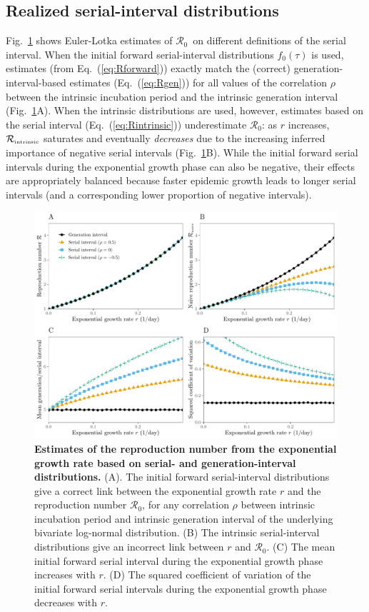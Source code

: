 \documentclass[12pt]{article}
\newcommand{\eref}[1]{Eq.~(\ref{eq:#1})}
\newcommand{\fref}[1]{Fig.~\ref{fig:#1}}
\newcommand{\Rx}[1]{\ensuremath{{\mathcal R}_{#1}}\xspace}
\newcommand{\Ro}{\Rx{0}}
\newcommand{\Rintrinsic}{\ensuremath{{\mathcal R}_{\textrm{\tiny intrinsic}}}\xspace}
\providecommand{\DIFaddtex}[1]{{\protect\color{blue}\uwave{#1}}} %
\providecommand{\DIFaddbegin}{} %
\providecommand{\DIFaddend}{} %
\providecommand{\DIFadd}[1]{\texorpdfstring{\DIFaddtex{#1}}{#1}} %
\newcommand{\DIFaddincludegraphics}[2][]{{\color{blue}\fbox{\DIFOincludegraphics[#1]{#2}}}} %
\DeclareRobustCommand{\DIFaddbegin}{\DIFOaddbegin \let\includegraphics\DIFaddincludegraphics} %
\DeclareRobustCommand{\DIFaddend}{\DIFOaddend \let\includegraphics\DIFOincludegraphics} %
\begin{document}
\subsection{Realized serial-interval distributions}

\fref{rR} shows Euler-Lotka estimates of \Ro\ \DIFaddbegin \DIFadd{based }\DIFaddend on different definitions of the serial interval. 
When the initial forward serial-interval distributions $f_0(\tau)$ is used, estimates (from \eref{Rforward}) exactly match the (correct) generation-interval-based estimates (\eref{Rgen}) for all values of the correlation $\rho$ between the intrinsic incubation period and the intrinsic generation interval (\fref{rR}A).
When the intrinsic distributions are used, however, estimates based on the serial interval (\eref{Rintrinsic}) underestimate \Ro: as $r$ increases, \Rintrinsic saturates and eventually \emph{decreases} due to the increasing inferred importance of negative serial intervals (\fref{rR}B).
While the initial forward serial intervals during the exponential growth phase can also be negative, their effects are appropriately balanced because faster epidemic growth leads to longer serial intervals (and a corresponding lower proportion of negative intervals).

\begin{figure}[!th]
\includegraphics[width=\textwidth]{rR.pdf}
\caption{
\textbf{Estimates of the reproduction number from the exponential growth rate based on serial- and generation-interval distributions.}
(A). The initial forward serial-interval distributions give a correct
link between the exponential growth rate $r$ and the reproduction
number \Ro,
for any correlation $\rho$ between intrinsic incubation period and
intrinsic generation interval of the underlying bivariate log-normal distribution.
(B) The intrinsic serial-interval distributions give an incorrect link between $r$ and \Ro.
(C) The mean initial forward serial interval during the exponential growth phase increases with $r$.
(D) The squared coefficient of variation of the initial forward serial intervals during the exponential growth phase decreases with $r$.
}
\label{fig:rR}
\end{figure}
\end{document}
